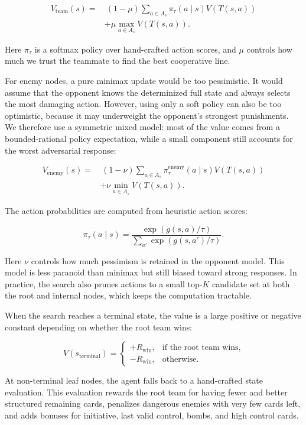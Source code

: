 \begin{align*}
    V_{\mathrm{team}}(s)
    = & \ (1-\mu)
    \sum_{a \in A_s}
    \pi_{\tau}(a \mid s) V(T(s,a))        \\
      & + \mu \max_{a \in A_s} V(T(s,a)).
\end{align*}

Here \(\pi_{\tau}\) is a softmax policy over hand-crafted action scores, and
\(\mu\) controls how much we trust the teammate to find the best cooperative
line.

For enemy nodes, a pure minimax update would be too pessimistic. It would assume
that the opponent knows the determinized full state and always selects the most
damaging action. However, using only a soft policy can also be too optimistic,
because it may underweight the opponent's strongest punishments. We therefore
use a symmetric mixed model: most of the value comes from a bounded-rational
policy expectation, while a small component still accounts for the worst
adversarial response:

\begin{align*}
    V_{\mathrm{enemy}}(s)
    = & \ (1-\nu)
    \sum_{a \in A_s}
    \pi_{\tau}^{\mathrm{enemy}}(a \mid s)
    V(T(s,a))                             \\
      & + \nu \min_{a \in A_s} V(T(s,a)).
\end{align*}

The action probabilities are computed from heuristic action scores:

\[
    \pi_{\tau}(a \mid s)
    =
    \frac{\exp(g(s,a)/\tau)}
    {\sum_{a'} \exp(g(s,a')/\tau)}.
\]

Here \(\nu\) controls how much pessimism is retained in the opponent model.
This model is less paranoid than minimax but still biased toward strong
responses. In practice, the search also prunes actions to a small top-\(K\)
candidate set at both the root and internal nodes, which keeps the computation
tractable.

When the search reaches a terminal state, the value is a large positive or
negative constant depending on whether the root team wins:

\[
    V(s_{\mathrm{terminal}})
    =
    \begin{cases}
        +R_{\mathrm{win}}, & \text{if the root team wins}, \\
        -R_{\mathrm{win}}, & \text{otherwise}.
    \end{cases}
\]

At non-terminal leaf nodes, the agent falls back to a hand-crafted state
evaluation. This evaluation rewards the root team for having fewer and better
structured remaining cards, penalizes dangerous enemies with very few cards
left, and adds bonuses for initiative, last valid control, bombs, and high
control cards.

